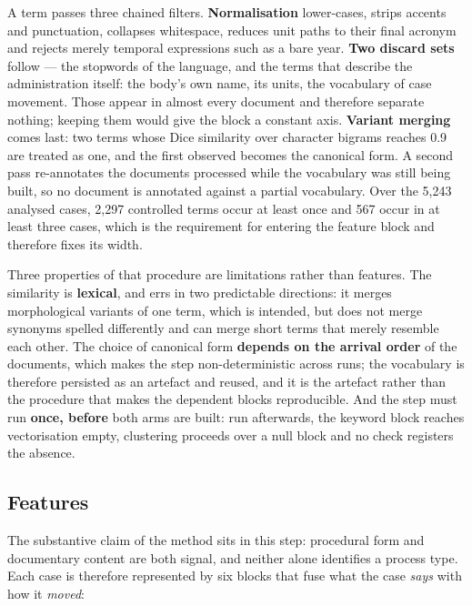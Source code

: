A term passes three chained filters. \textbf{Normalisation} lower-cases, strips accents and
punctuation, collapses whitespace, reduces unit paths to their final acronym and rejects merely
temporal expressions such as a bare year. \textbf{Two discard sets} follow --- the stopwords of
the language, and the terms that describe the administration itself: the body's own name, its
units, the vocabulary of case movement. Those appear in almost every document and therefore
separate nothing; keeping them would give the block a constant axis. \textbf{Variant merging}
comes last: two terms whose Dice similarity over character bigrams reaches 0.9 are treated as
one, and the first observed becomes the canonical form. A second pass re-annotates the documents
processed while the vocabulary was still being built, so no document is annotated against a
partial vocabulary. Over the 5{,}243 analysed cases, 2{,}297 controlled terms occur at least
once and 567 occur in at least three cases, which is the requirement for entering the feature
block and therefore fixes its width.

Three properties of that procedure are limitations rather than features. The similarity is
\textbf{lexical}, and errs in two predictable directions: it merges morphological variants of one
term, which is intended, but does not merge synonyms spelled differently and can merge short
terms that merely resemble each other. The choice of canonical form \textbf{depends on the
arrival order} of the documents, which makes the step non-deterministic across runs; the
vocabulary is therefore persisted as an artefact and reused, and it is the artefact rather than
the procedure that makes the dependent blocks reproducible. And the step must run \textbf{once,
before} both arms are built: run afterwards, the keyword block reaches vectorisation empty,
clustering proceeds over a null block and no check registers the absence.

\subsection{Features}\label{sec:features}

The substantive claim of the method sits in this step: procedural form and documentary content
are both signal, and neither alone identifies a process type. Each case is therefore represented
by six blocks that fuse what the case \emph{says} with how it \emph{moved}:

